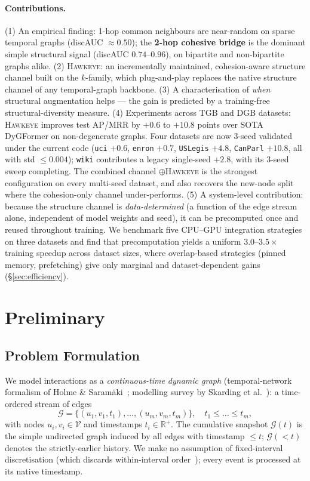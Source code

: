 \documentclass[sigconf,nonacm,review]{acmart}
\newcommand{\method}{\textsc{Hawkeye}\xspace}
\newcommand{\R}{\mathbb{R}}
\newcommand{\Gcal}{\mathcal{G}}
\newcommand{\Vcal}{\mathcal{V}}
\begin{document}
\paragraph{Contributions.}
(1) An empirical finding: 1-hop common neighbours are near-random on sparse
temporal graphs (discAUC $\approx 0.50$); the \textbf{2-hop cohesive bridge} is
the dominant simple structural signal (discAUC $0.74$--$0.96$), on bipartite
and non-bipartite graphs alike.
(2) \method: an incrementally maintained, cohesion-aware structure channel
built on the $k$-family, which plug-and-play replaces the native structure
channel of any temporal-graph backbone.
(3) A characterisation of \emph{when} structural augmentation helps --- the
gain is predicted by a training-free structural-diversity measure.
(4) Experiments across TGB and DGB datasets: \method improves test AP/MRR by
$+0.6$ to $+10.8$ points over SOTA DyGFormer on non-degenerate graphs.
Four datasets are now 3-seed validated under the current code
(\texttt{uci} $+0.6$, \texttt{enron} $+0.7$, \texttt{USLegis} $+4.8$,
\texttt{CanParl} $+10.8$, all with std $\le 0.004$); \texttt{wiki}
contributes a legacy single-seed $+2.8$, with its 3-seed sweep
completing. The combined channel $\oplus$\method is the strongest
configuration on every multi-seed dataset, and also recovers the
new-node split where the cohesion-only channel under-performs.
(5) A system-level contribution: because the structure channel is
\emph{data-determined} (a function of the edge stream alone, independent of
model weights and seed), it can be precomputed once and reused throughout
training. We benchmark five CPU--GPU integration strategies on three datasets
and find that precomputation yields a uniform $\mathbf{3.0}$--$\mathbf{3.5\times}$
training speedup across dataset sizes, where overlap-based strategies (pinned
memory, prefetching) give only marginal and dataset-dependent gains
(\S\ref{sec:efficiency}).

\section{Preliminary}
\label{sec:prelim}

\subsection{Problem Formulation}
We model interactions as a \emph{continuous-time dynamic graph}
(temporal-network formalism of Holme \& Saram\"aki~\cite{holme2012temporal};
modelling survey by Skarding et al.~\cite{skarding2021dtdg}): a time-ordered
stream of edges
\begin{equation}
\Gcal = \{(u_1,v_1,t_1),\dots,(u_m,v_m,t_m)\},\quad t_1\le\dots\le t_m,
\end{equation}
with nodes $u_i,v_i\in\Vcal$ and timestamps $t_i\in\R^{+}$. The cumulative
snapshot $\Gcal(t)$ is the simple undirected graph induced by all edges with
timestamp $\le t$; $\Gcal(<t)$ denotes the strictly-earlier history. We make
no assumption of fixed-interval discretisation (which discards within-interval
order~\cite{holme2012temporal}); every event is processed at its native
timestamp.
\end{document}
